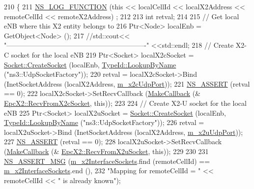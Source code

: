 \begin{DoxyCode}
210 \{
211   \hyperlink{log-macros-disabled_8h_a90b90d5bad1f39cb1b64923ea94c0761}{NS\_LOG\_FUNCTION} (\textcolor{keyword}{this} << localCellId << localX2Address << remoteCellId << remoteX2Address)
      ;
212 
213   \textcolor{keywordtype}{int} retval;
214 
215   \textcolor{comment}{// Get local eNB where this X2 entity belongs to}
216   Ptr<Node> localEnb = GetObject<Node> ();
217 \textcolor{comment}{//std::cout<< "-------------------------------------------------------------" <<std::endl;}
218   \textcolor{comment}{// Create X2-C socket for the local eNB}
219   Ptr<Socket> localX2cSocket = \hyperlink{classns3_1_1Socket_ad448a62bb50ad3dbac59c879a885a8d2}{Socket::CreateSocket} (localEnb, 
      \hyperlink{classns3_1_1TypeId_a119cf99c20931fdc294602cd360b180e}{TypeId::LookupByName} (\textcolor{stringliteral}{"ns3::UdpSocketFactory"}));
220   retval = localX2cSocket->Bind (InetSocketAddress (localX2Address, \hyperlink{classns3_1_1EpcX2_aa2fe730659f6fc10fcd8c44272f96dde}{m\_x2cUdpPort}));
221   \hyperlink{assert_8h_a6dccdb0de9b252f60088ce281c49d052}{NS\_ASSERT} (retval == 0);
222   localX2cSocket->SetRecvCallback (\hyperlink{group__makecallbackmemptr_ga9376283685aa99d204048d6a4b7610a4}{MakeCallback} (&
      \hyperlink{classns3_1_1EpcX2_a72bf05af65397dab7bc65df72bb09ebf}{EpcX2::RecvFromX2cSocket}, \textcolor{keyword}{this}));
223 
224   \textcolor{comment}{// Create X2-U socket for the local eNB}
225   Ptr<Socket> localX2uSocket = \hyperlink{classns3_1_1Socket_ad448a62bb50ad3dbac59c879a885a8d2}{Socket::CreateSocket} (localEnb, 
      \hyperlink{classns3_1_1TypeId_a119cf99c20931fdc294602cd360b180e}{TypeId::LookupByName} (\textcolor{stringliteral}{"ns3::UdpSocketFactory"}));
226   retval = localX2uSocket->Bind (InetSocketAddress (localX2Address, \hyperlink{classns3_1_1EpcX2_aa0e3b62bf699a12b65309cb25f232974}{m\_x2uUdpPort}));
227   \hyperlink{assert_8h_a6dccdb0de9b252f60088ce281c49d052}{NS\_ASSERT} (retval == 0);
228   localX2uSocket->SetRecvCallback (\hyperlink{group__makecallbackmemptr_ga9376283685aa99d204048d6a4b7610a4}{MakeCallback} (&
      \hyperlink{classns3_1_1EpcX2_af7142276a4a54af090466d51a31c796f}{EpcX2::RecvFromX2uSocket}, \textcolor{keyword}{this}));
229 
230 
231   \hyperlink{assert_8h_aff5ece9066c74e681e74999856f08539}{NS\_ASSERT\_MSG} (\hyperlink{classns3_1_1EpcX2_a0665276228b9b99a52ef6d5e9bdb306d}{m\_x2InterfaceSockets}.find (remoteCellId) == 
      \hyperlink{classns3_1_1EpcX2_a0665276228b9b99a52ef6d5e9bdb306d}{m\_x2InterfaceSockets}.end (),
232                  \textcolor{stringliteral}{"Mapping for remoteCellId = "} << remoteCellId << \textcolor{stringliteral}{" is already known"});

\end{DoxyCode}
